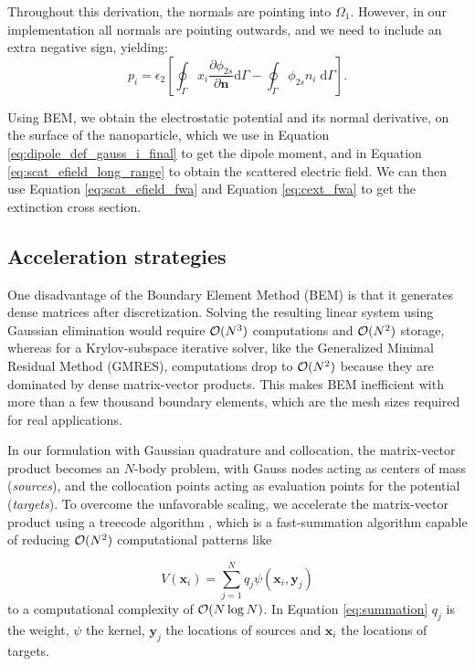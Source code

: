 %
Throughout this derivation, the normals are pointing into $\Omega_1$. However, in our implementation 
all normals are pointing outwards, and we need to include an extra negative sign, yielding:
%
\begin{equation} \label{eq:dipole_def_gauss_i_final}
{p_i} = \epsilon_2 \left[ \oint_\Gamma  x_i  \frac{\partial \phi_{2s}}{\partial \mathbf{n}} \text{d}\Gamma - \oint_\Gamma \phi_{2s} n_i \; \text{d}\Gamma \right].
\end{equation}

Using BEM, we obtain the electrostatic potential and its normal derivative, on the surface of the nanoparticle, 
which we use in Equation \eqref{eq:dipole_def_gauss_i_final} to get the dipole 
moment, and in Equation \eqref{eq:scat_efield_long_range} to obtain the scattered
electric field. We can then use Equation \eqref{eq:scat_efield_fwa} and Equation 
\eqref{eq:cext_fwa} to get the extinction cross section.


\subsection{Acceleration strategies} \label{sec:acc_strategies}

One disadvantage of the Boundary Element Method (BEM) is that it generates dense matrices
after discretization. Solving the resulting linear system using
Gaussian elimination would require $\mathcal{O}(N^3)$ computations and $\mathcal{O}(N^2)$ storage, whereas for a
Krylov-subspace iterative solver, like the Generalized Minimal Residual Method (GMRES),
computations drop to $\mathcal{O}(N^2)$ because they are dominated by dense matrix-vector 
products. This makes BEM inefficient with more than a few thousand boundary elements,
which are the mesh sizes required for real applications. 

In our formulation with Gaussian quadrature and collocation, the matrix-vector product
becomes an $N$-body problem, with Gauss nodes acting as centers of mass (\emph{sources}), 
and the collocation points acting as evaluation points for the potential (\emph{targets}).
To overcome the unfavorable scaling,
we accelerate the matrix-vector product using a treecode algorithm \cite{BarnesHut1986,DuanKrasny2001}, 
which is a fast-summation algorithm capable of reducing $\mathcal{O}(N^2)$
computational patterns like

\begin{equation} \label{eq:summation}
V(\mathbf{x}_i) = \sum_{j=1}^{N} q_j \psi(\mathbf{x}_i, \mathbf{y}_j) 
\end{equation}
%
to a computational complexity of $\mathcal{O}(N \log N)$. In Equation \eqref{eq:summation} 
$q_j$ is the weight, $\psi$ the kernel, $\mathbf{y}_j$ the locations of sources and 
$\mathbf{x}_i$ the locations of targets.

